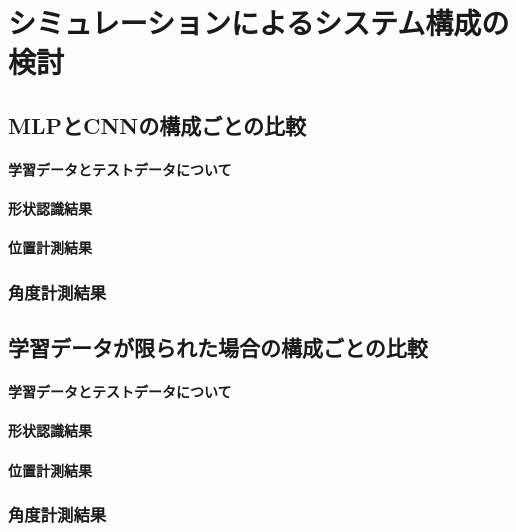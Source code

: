 \chapter{シミュレーションによるシステム構成の検討}


\section{MLPとCNNの構成ごとの比較}

\subsubsection{学習データとテストデータについて}

\subsubsection{形状認識結果}

\subsubsection{位置計測結果}

\subsection{角度計測結果}


\section{学習データが限られた場合の構成ごとの比較}

\subsubsection{学習データとテストデータについて}

\subsubsection{形状認識結果}

\subsubsection{位置計測結果}

\subsection{角度計測結果}


